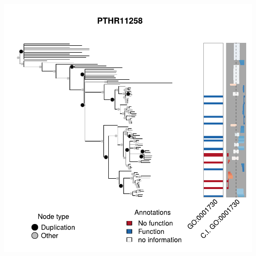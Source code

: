 \documentclass[aspectratio=169,9pt,handout]{beamer}
\begin{document}
\begin{frame}[t, label=aphylo-good]
\begin{minipage}[m]{.65\linewidth}
{			\includegraphics[width=.9\linewidth, clip, trim={0 0 0 2cm}]{example-trees-good1-parts-1b.pdf}
		}
	
		
	\end{minipage}
\end{frame}
\end{document}
